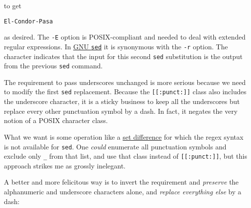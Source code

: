 \documentclass[
  a4paper,
]{article}
\newenvironment{Shaded}{\begin{snugshade}}{\end{snugshade}}
\newcommand{\AttributeTok}[1]{\textcolor[rgb]{0.80,0.80,0.80}{#1}}
\newcommand{\FunctionTok}[1]{\textcolor[rgb]{0.94,0.94,0.56}{#1}}
\newcommand{\KeywordTok}[1]{\textcolor[rgb]{0.94,0.87,0.69}{#1}}
\newcommand{\OperatorTok}[1]{\textcolor[rgb]{0.94,0.94,0.82}{#1}}
\newcommand{\StringTok}[1]{\textcolor[rgb]{0.80,0.58,0.58}{#1}}
\begin{document}
\begin{Shaded}
\end{Shaded}

to get

\begin{verbatim}
El-Condor-Pasa
\end{verbatim}

as desired. The \texttt{-E} option is POSIX-compliant and needed to deal
with extended regular expressions. In
\href{https://www.gnu.org/software/sed/manual/html_node/Command_002dLine-Options.html}{GNU
\texttt{sed}} it is synonymous with the \texttt{-r} option. The
\texttt{\textbar{}} character indicates that the input for this second
\texttt{sed} substitution is the output from the previous \texttt{sed}
command.

The requirement to pass underscores unchanged is more serious because we
need to modify the first \texttt{sed} replacement. Because the
\texttt{{[}{[}:punct:{]}{]}} class also includes the underscore
character, it is a sticky business to keep all the underscores but
replace every other punctuation symbol by a dash. In fact, it negates
the very notion of a POSIX character class.

What we want is some operation like a
\href{https://mathworld.wolfram.com/SetDifference.html}{set difference}
for which the regex syntax is not available for \texttt{sed}. One
\emph{could} enumerate all punctuation symbols and exclude only
\texttt{\_} from that list, and use that class instead of
\texttt{{[}{[}:punct:{]}{]}}, but this approach strikes me as grossly
inelegant.

A better and more felicitous way is to invert the requirement and
\emph{preserve} the alphanumeric and underscore characters alone, and
\emph{replace everything else} by a dash:

\begin{Shaded}
\end{Shaded}
\end{document}
